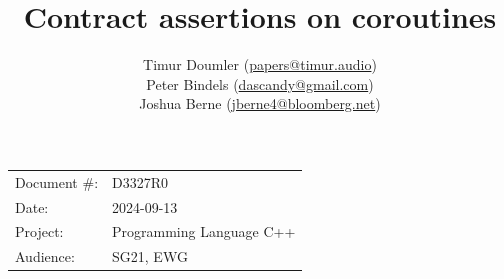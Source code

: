 

 \usepackage[bottom]{footmisc} 

 \usepackage{longtable}


\usepackage{tikz,lipsum,lmodern}
\usepackage[most]{tcolorbox}



\usepackage{titlesec}
\usepackage{tocloft}


\newcommand{\changelocaltocdepth}[1]{%
  \addtocontents{toc}{\protect\setcounter{tocdepth}{#1}}%
  \setcounter{tocdepth}{#1}%
}

\setcounter{tocdepth}{3}



\title{Contract assertions on coroutines}
\author{
Timur Doumler \small(\href{mailto:papers@timur.audio}{papers@timur.audio}) \\
Peter Bindels \small(\href{mailto:dascandy@gmail.com}{dascandy@gmail.com}) \\
Joshua Berne \small(\href{mailto:jberne4@bloomberg.net}{jberne4@bloomberg.net}) 
}
\date{}
\maketitle

\begin{tabular}{ll}
Document \#: & D3327R0 \\
Date: &2024-09-13 \\
Project: & Programming Language C++ \\
Audience: & SG21, EWG
\end{tabular}

